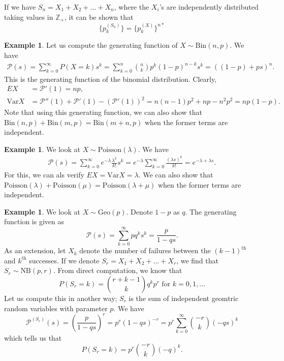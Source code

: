 \documentclass[15pt,a4paper]{book}
\theoremstyle{definition}
\newtheorem{example}[theorem]{Example}
\newcommand{\Z}{\mathbb{Z}}
\newcommand{\cP}{\mathcal{P}}
\newcommand{\Var}{\text{Var}}
\begin{document}
If we have $S_{n} = X_{1} + X_{2} + \ldots + X_{n}$, where the $X_{i}$'s are independently distributed taking values in $\Z_{+}$, it can be shown that
\begin{equation}
    \{p_{k}^{(S_{n})}\} = \{p_{k}^{(X)}\}^{n \ast}
\end{equation}
\begin{example}
    Let us compute the generating function of $X \sim \text{Bin}(n,p)$. We have
    \begin{align}
        \cP (s) = \sum_{k=0}^{\infty} P(X=k) s^{k} = \sum_{k=0}^{n} \binom{n}{k} p^{k} (1-p)^{n-k} s^{k} = \left( (1-p) + ps \right)^{n}.
    \end{align}
    This is the generating function of the binomial distribution. Clearly,
    \begin{align*}
        EX &= \cP '(1) = np,\\
        \Var X &= \cP ''(1) + \cP '(1) - (\cP'(1))^{2} = n(n-1)p^{2} + np - n^{2}p^{2} = np(1-p).
    \end{align*}
    Note that using this generating function, we can also show that $\text{Bin}(n,p) + \text{Bin}(m,p) = \text{Bin}(m+n,p)$ when the former terms are independent.
\end{example}
\begin{example}
    We look at $X \sim \text{Poisson}(\lambda)$. We have
    \begin{align}
        \cP (s) = \sum_{k=0}^{\infty} e^{-\lambda} \frac{\lambda^{k}}{k!} s^{k} = e^{-\lambda} \sum_{k=0}^{\infty} \frac{(\lambda s)^{k}}{k!} = e^{-\lambda + \lambda s}.
    \end{align}
    For this, we can als verify $EX = \Var X = \lambda$. We can also show that $\text{Poisson}(\lambda) + \text{Poisson}(\mu) = \text{Poisson}(\lambda + \mu)$ when the former terms are independent.
\end{example}
\begin{example}
    We look at $X \sim \text{Geo}(p)$. Denote $1-p$ as $q$. The generating function is given as
    \begin{equation}
        \cP (s) = \sum_{k=0}^{\infty} pq^{k}s^{k} = \frac{p}{1-qs}.
    \end{equation}
    As an extension, let $X_{k}$ denote the number of failures between the $(k-1)^{\text{th}}$ and $k^{\text{th}}$ successes. If we denote $S_{r} = X_{1} + X_{2} + \ldots + X_{r}$, we find that $S_{r} \sim \text{NB}(p,r)$. From direct computation, we know that
    \begin{equation*}
        P(S_{r} = k) = \binom{r+k-1}{k} q^{k} p^{r} \text{ for } k = 0,1,\ldots
    \end{equation*}
    Let us compute this in another way; $S_{r}$ is the sum of independent geomtric random variables with parameter $p$. We have
    \begin{equation}
        \cP^{(S_{r})}(s) = \left( \frac{p}{1-qs} \right)^{r} = p^{r}(1-qs)^{-r} = p^{r} \sum_{k=0}^{\infty} \binom{-r}{k} (-qs)^{k}
    \end{equation}
    which tells us that
    \begin{equation}
        P(S_{r}=k) = p^{r}\binom{-r}{k} (-q)^{k}.
    \end{equation}
\end{example}
\end{document}
